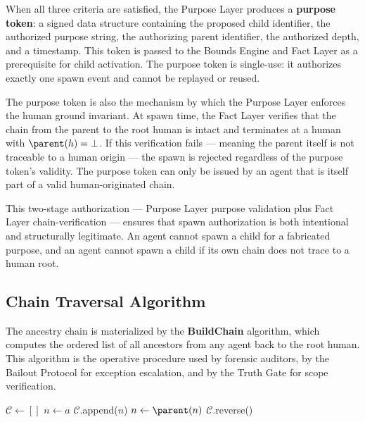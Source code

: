 When all three criteria are satisfied, the Purpose Layer produces a \textbf{purpose token}: a signed data structure containing the proposed child identifier, the authorized purpose string, the authorizing parent identifier, the authorized depth, and a timestamp. This token is passed to the Bounds Engine and Fact Layer as a prerequisite for child activation. The purpose token is single-use: it authorizes exactly one spawn event and cannot be replayed or reused.

The purpose token is also the mechanism by which the Purpose Layer enforces the human ground invariant. At spawn time, the Fact Layer verifies that the chain from the parent to the root human is intact and terminates at a human with $\parent(h) = \bot$. If this verification fails — meaning the parent itself is not traceable to a human origin — the spawn is rejected regardless of the purpose token's validity. The purpose token can only be issued by an agent that is itself part of a valid human-originated chain.

This two-stage authorization — Purpose Layer purpose validation plus Fact Layer chain-verification — ensures that spawn authorization is both intentional and structurally legitimate. An agent cannot spawn a child for a fabricated purpose, and an agent cannot spawn a child if its own chain does not trace to a human root.

\subsection{Chain Traversal Algorithm}
\label{sec:chain-traversal}

The ancestry chain is materialized by the \textbf{BuildChain} algorithm, which computes the ordered list of all ancestors from any agent back to the root human. This algorithm is the operative procedure used by forensic auditors, by the Bailout Protocol for exception escalation, and by the Truth Gate for scope verification.

\begin{algorithm}[h]
\caption{BuildChain: Compute the ordered ancestry chain from an agent to the root human}
\label{alg:build-chain}
\begin{algorithmic}
    \State $\mathcal{C} \gets []$  
    \State $n \gets a$
        \State $\mathcal{C}$.append($n$)
        \State $n \gets \parent(n)$
    \EndWhile
    \State \Return $\mathcal{C}$.reverse()
\EndProcedure
\end{algorithmic}
\end{algorithm}

